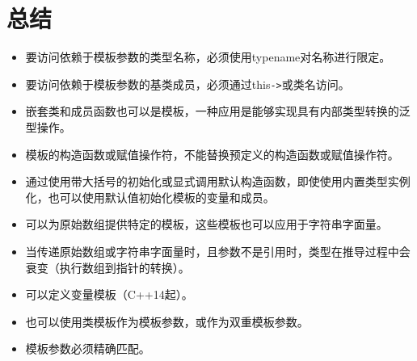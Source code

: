 \section{总结}

\begin{itemize}
\item 
要访问依赖于模板参数的类型名称，必须使用typename对名称进行限定。

\item 
要访问依赖于模板参数的基类成员，必须通过this\texttt{->}或类名访问。

\item 
嵌套类和成员函数也可以是模板，一种应用是能够实现具有内部类型转换的泛型操作。

\item 
模板的构造函数或赋值操作符，不能替换预定义的构造函数或赋值操作符。

\item 
通过使用带大括号的初始化或显式调用默认构造函数，即使使用内置类型实例化，也可以使用默认值初始化模板的变量和成员。

\item 
可以为原始数组提供特定的模板，这些模板也可以应用于字符串字面量。

\item 
当传递原始数组或字符串字面量时，且参数不是引用时，类型在推导过程中会衰变（执行数组到指针的转换）。

\item 
可以定义变量模板（C++14起）。

\item 
也可以使用类模板作为模板参数，或作为双重模板参数。

\item 
模板参数必须精确匹配。
\end{itemize}